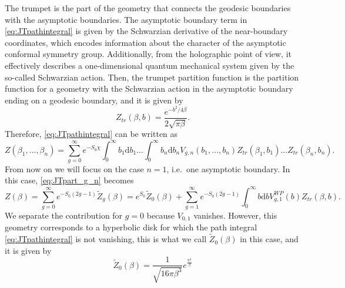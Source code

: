 \documentclass[a4paper,11pt]{article}
\newcommand{\rmd}{\mathrm{d}}
\begin{document}
The trumpet is the part of the geometry that connects the geodesic boundaries with the asymptotic boundaries. The asymptotic boundary term in \eqref{eq:JTpathintegral} is given by the Schwarzian derivative of the near-boundary coordinates, which encodes information about the character of the asymptotic conformal symmetry group. Additionally, from the holographic point of view, it effectively describes a one-dimensional quantum mechanical system given by the so-called Schwarzian action. Then, the trumpet partition function is the partition function for a geometry with the Schwarzian action in the asymptotic boundary ending on a geodesic boundary, and it is given by
\begin{equation}
    Z_{tr}(\beta,b)=\frac{e^{-b^2/4\beta}}{2\sqrt{\pi \beta}}.
\end{equation}
Therefore, \eqref{eq:JTpathintegral} can be written as 
\begin{equation}
    Z(\beta_1,\dots,\beta_n)=\sum_{g=0}^\infty e^{-S_0 \chi}\int_0^\infty b_1 \rmd b_1 \dots \int_0^\infty b_n\rmd b_n V_{g,n}(b_1,\dots,b_n)Z_{tr}(\beta_1,b_1)\dots Z_{tr}(\beta_n,b_n).\label{eq:JTpart_g_n}
\end{equation}
From now on we will focus on the case $n=1$, i.e.\ one asymptotic boundary. In this case, \eqref{eq:JTpart_g_n} becomes 
\begin{equation}
    Z(\beta)=\sum_{g=0}^\infty e^{-S_0(2g-1)} \tilde{Z}_g(\beta)= e^{S_0} \tilde{Z}_0(\beta) + \sum_{g=1}^\infty e^{-S_0(2g-1)}\int_0^\infty b\rmd b V^{WP}_{g,1}(b)Z_{tr}(\beta,b).
\end{equation}
We separate the contribution for $g=0$ because $V_{0,1}$ vanishes. However, this geometry corresponds to a hyperbolic disk for which the path integral \eqref{eq:JTpathintegral} is not vanishing, this is what we call $\tilde{Z}_0(\beta)$ in this case, and it is given by \cite{Saad:2019lba}
\begin{equation}
    \tilde{Z}_0(\beta)=\frac{1}{\sqrt{16\pi\beta^3}}e^{\frac{\pi^2}{\beta}}
\end{equation}
\end{document}
